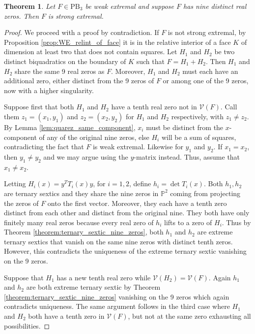 \documentclass[a4paper]{article}
\numberwithin{equation}{section}
\newcommand{\ProjP}{\mathbb{P}}
\newcommand{\V}{\mathcal{V}}
\newtheorem{theorem}{Theorem}[section]
\theoremstyle{definition}
\theoremstyle{remark}
\begin{document}
\begin{theorem}\label{thm:WE_nine_zeros}
Let $F \in \mathrm{PB}_3$ be weak extremal and suppose $F$ has nine distinct real zeros.  Then $F$ is strong extremal.
\end{theorem}
\begin{proof}
We proceed with a proof by contradiction.
If $F$ is not strong extremal, by Proposition \ref{prop:WE_relint_of_face} it is in the relative interior of a face $K$ of dimension at least two that does not contain squares.  Let $H_1$ and $H_2$ be two distinct biquadratics on the boundary of $K$ such that $F = H_1 + H_2$.
Then $H_1$ and $H_2$ share the same 9 real zeros as $F$.  Moreover, $H_1$ and $H_2$ must each have an additional zero, either distinct from the 9 zeros of $F$ or among one of the 9 zeros, now with a higher singularity.

Suppose first that both $H_1$ and $H_2$ have a tenth real zero not in $\V(F)$.  Call them $z_1 = (x_1,y_1)$ and $z_2 = (x_2,y_2)$ for $H_1$ and $H_2$ respectively, with $z_1 \neq z_2$.  By Lemma \ref{lem:quarez_same_component}, $x_i$ must be distinct from the $x$-component of any of the original nine zeros, else $H_i$ will be a sum of squares, contradicting the fact that $F$ is weak extremal.  Likewise for $y_1$ and $y_2$.  If $x_1 = x_2$, then $y_1 \neq y_2$ and we may argue using the $y$-matrix instead.  Thus, assume that $x_1 \neq x_2$.


Letting $H_i(x) = y^TT_i(x)y$, for $i = 1,2$, define $h_i = \det T_i(x)$.  
Both $h_1,h_2$ are ternary sextics and they share the nine zeros in $\ProjP^2$ coming from projecting the zeros of $F$ onto the first vector.  Moreover, they each have a tenth zero distinct from each other and distinct from the original nine. They both have only finitely many real zeros because every real zero of $h_i$ lifts to a zero of $H_i$.
Thus by Theorem \ref{theorem:ternary_sextic_nine_zeros}, both  $h_1$ and $h_2$ are extreme ternary sextics that vanish on the same nine zeros with distinct tenth zeros.
However, this contradicts the uniqueness of the extreme ternary sextic vanishing on the 9 zeros.

Suppose that $H_1$ has a new tenth real zero while $\V(H_2) = \V(F)$.
Again $h_1$ and $h_2$ are both extreme ternary sextic by Theorem \ref{theorem:ternary_sextic_nine_zeros} vanishing on the 9 zeros which again contradicts uniqueness.  The same argument follows in the third case where $H_1$ and $H_2$ both have a tenth zero in $\V(F)$, but not at the same zero exhausting all possibilities.   
\end{proof}
\end{document}
